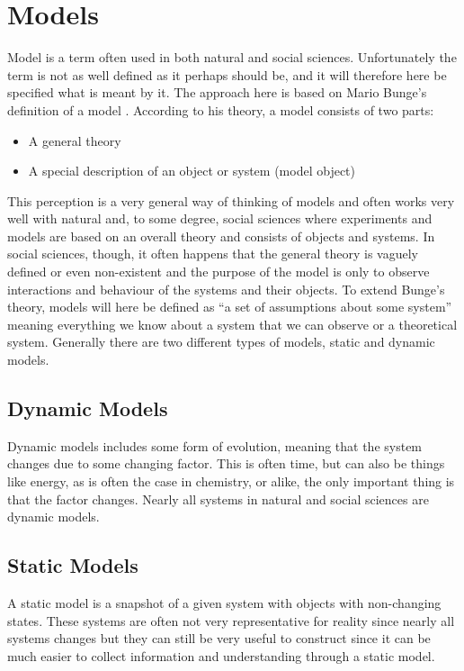 \section{Models}
\label{sec:models}
Model is a term often used in both natural and social sciences. Unfortunately the term is not as well defined as it perhaps should be, and it will therefore here be specified what is meant by it. The approach here is based on Mario Bunge's definition of a model . According to his theory, a model consists of two parts:

\begin{itemize}
\item A general theory
\item A special description of an object or system (model object)
\end{itemize}

This perception is a very general way of thinking of models and often works very well with natural and, to some degree, social sciences where experiments and models are based on an overall theory and consists of objects and systems. In social sciences, though, it often happens that the general theory is vaguely defined or even non-existent and the purpose of the model is only to observe interactions and behaviour of the systems and their objects.
To extend Bunge's theory, models will here be defined as \enquote{a set of assumptions about some system} meaning everything we know about a system that we can observe or a theoretical system.
Generally there are two different types of models, static and dynamic models.


\subsection{Dynamic Models}
Dynamic models includes some form of evolution, meaning that the system changes due to some changing factor. This is often time, but can also be things like energy, as is often the case in chemistry, or alike, the only important thing is that the factor changes. Nearly all systems in natural and social sciences are dynamic models.


\subsection{Static Models}
A static model is a snapshot of a given system with objects with non-changing states. These systems are often not very representative for reality since nearly all systems changes but they can still be very useful to construct since it can be much easier to collect information and understanding through a static model.


